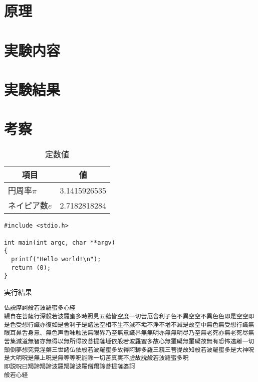 \documentclass[a4paper]{ltjsarticle}
\begin{document}
\section{原理}
\section{実験内容}
\section{実験結果}
\section{考察}


\begin{table}[H]
  \begin{center}
    \caption{定数値}
    \label{tb:env}
    \begin{tabular}{|l|r|} \hline
      \multicolumn{1}{|c|}{項目} & \multicolumn{1}{c|}{値} \\ \hline \hline
      円周率$\pi$ & 3.1415926535 \\ \hline
      ネイピア数$e$ & 2.7182818284 \\ \hline
    \end{tabular}
  \end{center}
\end{table}



\begin{lstlisting}[caption=main関数,label=src:main]
#include <stdio.h>

int main(int argc, char **argv)
{
  printf("Hello world!\n");
  return (0);
}
\end{lstlisting}


% 


\begin{result}{実行結果}
\begin{verbatim}
仏説摩訶般若波羅蜜多心経
観自在菩薩行深般若波羅蜜多時照見五蘊皆空度一切苦厄舎利子色不異空空不異色色即是空空即是色受想行識亦復如是舎利子是諸法空相不生不滅不垢不浄不増不減是故空中無色無受想行識無眼耳鼻舌身意、無色声香味触法無眼界乃至無意識界無無明亦無無明尽乃至無老死亦無老死尽無苦集滅道無智亦無得以無所得故菩提薩埵依般若波羅蜜多故心無罣礙無罣礙故無有恐怖遠離一切顛倒夢想究竟涅槃三世諸仏依般若波羅蜜多故得阿耨多羅三藐三菩提故知般若波羅蜜多是大神呪是大明呪是無上呪是無等等呪能除一切苦真実不虚故説般若波羅蜜多呪
即説呪曰羯諦羯諦波羅羯諦波羅僧羯諦菩提薩婆訶
般若心経
\end{verbatim}
\end{result}
\end{document}
